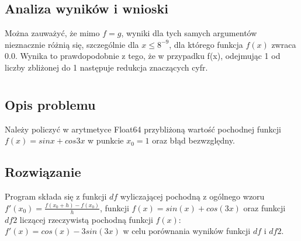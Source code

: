 \documentclass[11pt]{article}
\theoremstyle{remark}
\begin{document}
\subsection{Analiza wyników i wnioski} Można zauważyć, że mimo $f=g$, wyniki dla tych samych argumentów nieznacznie różnią się, szczególnie dla $x\leq8^{-9}$, dla którego funkcja $f(x)$ zwraca 0.0. Wynika to prawdopodobnie z tego, że w przypadku f(x), odejmując 1 od liczby zbliżonej do 1 następuje redukcja znaczących cyfr.

\section{}
\subsection{Opis problemu}
Należy policzyć w arytmetyce Float64 przybliżoną wartość pochodnej funkcji $f(x)=sinx+cos3x$ w punkcie $x_0=1$ oraz błąd bezwzględny.
\subsection{Rozwiązanie}
Program składa się z funkcji $df$ wyliczającej pochodną z ogólnego wzoru $f'(x_0)=\frac{f(x_0+h)-f(x_0)}{h}$, funkcji $f(x)=sin(x)+cos(3x)$ oraz funkcji $df2$ liczącej rzeczywistą pochodną funkcji $f(x)$: $f'(x)=cos(x)-3sin(3x)$ w celu porównania wyników funkcji $df$ i $df2$.
\end{document}
